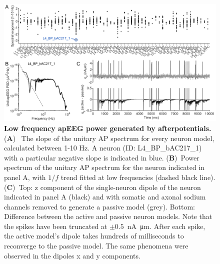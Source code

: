 \begin{figure}[h!]
    \centering
    \includegraphics[width=17cm]{Figures/chapter3/figureS3.png}
    \caption[Low frequency apEEG power generated by afterpotentials]{\textbf{Low frequency apEEG power generated by afterpotentials.} (\textbf{A})~ The slope of the unitary AP spectrum for every neuron model, calculated between 1-10 Hz. A neuron (ID: L4\_BP\_bAC217\_1) with a particular negative slope is indicated in blue. (\textbf{B})~Power spectrum of the unitary AP spectrum for the neuron indicated in panel A, with $1/f$ trend fitted at low frequencies (dashed black line). (\textbf{C})~Top: z component of the single-neuron dipole of the neuron indicated in panel A (black) and with somatic and axonal sodium channels removed to generate a passive model (grey). Bottom: Difference between the active and passive neuron models. Note that the spikes have been truncated at $\pm 0.5$~\unit{\nano\ampere\micro\meter}. After each spike, the active model's dipole takes hundreds of milliseconds to reconverge to the passive model. The same phenomena were observed in the dipoles x and y components. } 
    \label{fig:low_frequency_apEEG}
\end{figure}

\clearpage

